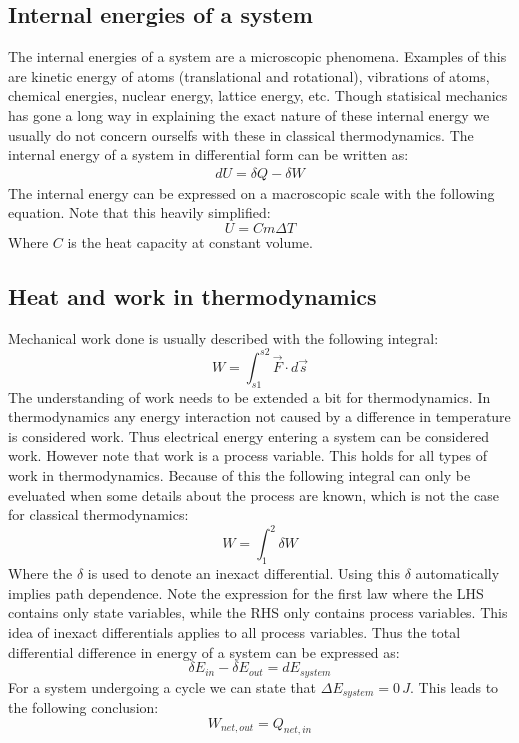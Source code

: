 \documentclass[11pt, a4paper]{article}
\begin{document}
\subsection{Internal energies of a system}
The internal energies of a system are a microscopic phenomena. Examples of this are kinetic energy of atoms (translational and rotational), vibrations of atoms, chemical energies, nuclear energy, lattice energy, etc. Though statisical mechanics has gone a long way in explaining the exact nature of these internal energy we usually do not concern ourselfs with these in classical thermodynamics. The internal energy of a system in differential form can be written as:
\begin{gather}
  dU = \delta Q - \delta W
\end{gather}
The internal energy can be expressed on a macroscopic scale with the following equation. Note that this heavily simplified:
\begin{equation}
  U = Cm \Delta T
\end{equation}
Where $C$ is the heat capacity at constant volume. 

\subsection{Heat and work in thermodynamics}
Mechanical work done is usually described with the following integral:
\begin{equation}
  W = \int_{s1}^{s2} \vec{F}\cdot d\vec{s}
\end{equation}
The understanding of work needs to be extended a bit for thermodynamics. In thermodynamics any energy interaction not caused by a difference in temperature is considered work. Thus electrical energy entering a system can be considered work. However note that work is a process variable. This holds for all types of work in thermodynamics. Because of this the following integral can only be eveluated when some details about the process are known, which is not the case for classical thermodynamics:
\begin{equation}
  W = \int_1^2 \delta W
\end{equation}
Where the $\delta$ is used to denote an inexact differential. Using this $\delta$ automatically implies path dependence. Note the expression for the first law where the LHS contains only state variables, while the RHS only contains process variables. This idea of inexact differentials applies to all process variables. Thus the total differential difference in energy of a system can be expressed as:
\begin{equation}
  \delta E_{in} - \delta E_{out} = dE_{system}
\end{equation}
For a system undergoing a cycle we can state that $\Delta E_{system} = 0\,J$. This leads to the following conclusion:
\begin{equation}
  W_{net,out} = Q_{net,in}
\end{equation}
\end{document}

